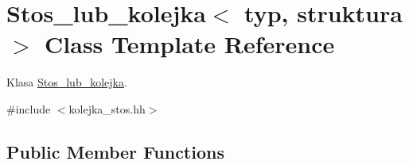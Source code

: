 \hypertarget{class_stos__lub__kolejka}{\section{Stos\+\_\+lub\+\_\+kolejka$<$ typ, struktura $>$ Class Template Reference}
\label{class_stos__lub__kolejka}
}


Klasa \hyperlink{class_stos__lub__kolejka}{Stos\+\_\+lub\+\_\+kolejka}.  




{\ttfamily \#include $<$kolejka\+\_\+stos.\+hh$>$}

\subsection*{Public Member Functions}
